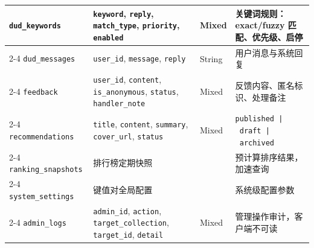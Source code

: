 \documentclass[a4paper,12pt]{article}
\begin{document}
\begin{table}[H]
{\begin{tabular}{p{2.6cm} p{4cm} p{2cm} p{5.1cm}}
      \texttt{dud\_keywords}                              & \texttt{keyword}, \texttt{reply}, \texttt{match\_type}, \linebreak \texttt{priority}, \texttt{enabled}            & Mixed        & 关键词规则：exact/fuzzy 匹配、优先级、启停                                                                                             \\
      \cmidrule{2-4}
      \texttt{dud\_messages}                              & \texttt{user\_id}, \texttt{message}, \texttt{reply}                                                               & String       & 用户消息与系统回复                                                                                                               \\
      \cmidrule{2-4}
      \texttt{feedback}                                   & \texttt{user\_id}, \texttt{content}, \texttt{is\_anonymous}, \linebreak \texttt{status}, \texttt{handler\_note}   & Mixed        & 反馈内容、匿名标识、处理备注                                                                                                          \\
      \cmidrule{2-4}
      \texttt{recommendations}                            & \texttt{title}, \texttt{content}, \texttt{summary}, \linebreak \texttt{cover\_url}, \texttt{status}               & Mixed        & \texttt{published\allowbreak\ |\allowbreak\ draft\allowbreak\ |\allowbreak\ archived}                                   \\
      \cmidrule{2-4}
      \texttt{ranking\_snapshots}                         & \multicolumn{2}{l}{排行榜定期快照}                                                                                       & 预计算排序结果，加速查询                                                                                                                           \\
      \cmidrule{2-4}
      \texttt{system\_settings}                           & \multicolumn{2}{l}{键值对全局配置}                                                                                       & 系统级配置参数                                                                                                                                \\
      \cmidrule{2-4}
      \texttt{admin\_logs}                                & \texttt{admin\_id}, \texttt{action}, \linebreak \texttt{target\_collection}, \texttt{target\_id}, \texttt{detail} & Mixed        & 管理操作审计，客户端不可读                                                                                                           \\
      \bottomrule
    \end{tabular}}
\end{table}
\end{document}
